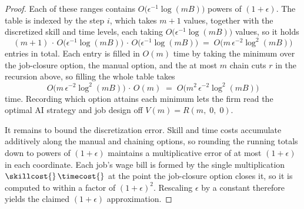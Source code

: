 \begin{proof}
Each of these ranges contains $O\bigl(\epsilon^{-1}\log(mB)\bigr)$ powers of $(1+\epsilon)$.
The table is indexed by the step $i$, which takes $m+1$ values, together with the discretized skill and time levels, each taking $O\bigl(\epsilon^{-1}\log(mB)\bigr)$ values, so it holds
\[
(m+1)\,\cdot\,O\bigl(\epsilon^{-1}\log(mB)\bigr)\,\cdot\,O\bigl(\epsilon^{-1}\log(mB)\bigr) \;=\; O\bigl(m\,\epsilon^{-2}\log^2(mB)\bigr)
\]
entries in total.
Each entry is filled in $O(m)$ time by taking the minimum over the job-closure option, the manual option, and the at most $m$ chain cuts $r$ in the recursion above, so filling the whole table takes
\[
O\bigl(m\,\epsilon^{-2}\log^2(mB)\bigr)\,\cdot\,O(m) \;=\; O\bigl(m^2\,\epsilon^{-2}\log^2(mB)\bigr)
\]
time.
Recording which option attains each minimum lets the firm read the optimal AI strategy and job design off $V(m) = R(m,\; 0,\; 0)$.

It remains to bound the discretization error.
Skill and time costs accumulate additively along the manual and chaining options, so rounding the running totals down to powers of $(1+\epsilon)$ maintains a multiplicative error of at most $(1+\epsilon)$ in each coordinate.
Each job's wage bill is formed by the single multiplication $\skillcost{}\,\timecost{}$ at the point the job-closure option closes it, so it is computed to within a factor of $(1+\epsilon)^2$.
Rescaling $\epsilon$ by a constant therefore yields the claimed $(1+\epsilon)$ approximation.
\end{proof}
